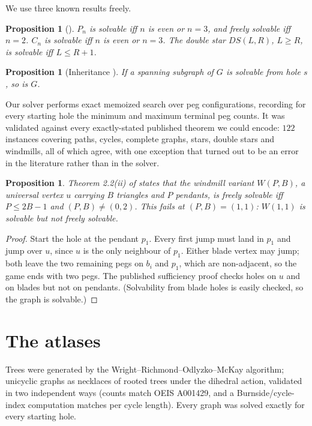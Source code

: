 \documentclass[11pt]{article}
\newtheorem{proposition}[theorem]{Proposition}
\theoremstyle{definition}
\begin{document}
We use three known results freely.

\begin{proposition}[{\cite{BH11,BH12}}]\label{prop:known}
$P_n$ is solvable iff $n$ is even or $n=3$, and freely solvable iff
$n=2$. $C_n$ is solvable iff $n$ is even or $n=3$. The double star
$DS(L,R)$, $L\ge R$, is solvable iff $L\le R+1$.
\end{proposition}

\begin{proposition}[Inheritance {\cite{BGH17}}]\label{prop:inherit}
If a spanning subgraph of $G$ is solvable from hole $s$, so is $G$.
\end{proposition}

Our solver performs exact memoized search over peg configurations,
recording for every starting hole the minimum and maximum terminal
peg counts. It was validated against every exactly-stated published
theorem we could encode: $122$ instances covering paths, cycles,
complete graphs, stars, double stars and windmills, all of which
agree, with one exception that turned out to be an error in the
literature rather than in the solver.

\begin{proposition}\label{prop:windmill}
Theorem 2.2(ii) of \cite{BH12} states that the windmill variant
$W(P,B)$, a universal vertex $u$ carrying $B$ triangles and $P$
pendants, is freely solvable iff $P\le 2B-1$ and $(P,B)\ne(0,2)$.
This fails at $(P,B)=(1,1)$: $W(1,1)$ is solvable but not freely
solvable.
\end{proposition}

\begin{proof}
Start the hole at the pendant $p_1$. Every first jump must land in
$p_1$ and jump over $u$, since $u$ is the only neighbour of $p_1$.
Either blade vertex may jump; both leave the two remaining pegs on
$b_i$ and $p_1$, which are non-adjacent, so the game ends with two
pegs. The published sufficiency proof checks holes on $u$ and on
blades but not on pendants. (Solvability from blade holes is easily
checked, so the graph is solvable.)
\end{proof}

\section{The atlases}\label{sec:atlas}

Trees were generated by the Wright--Richmond--Odlyzko--McKay
algorithm; unicyclic graphs as necklaces of rooted trees under the
dihedral action, validated in two independent ways (counts match
OEIS A001429, and a Burnside/cycle-index computation matches per
cycle length). Every graph was solved exactly for every starting
hole.
\end{document}
